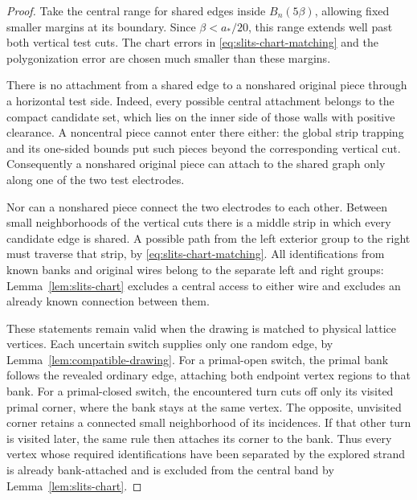 \begin{proof}
Take the central range for shared edges inside $B_n(5\beta)$,
allowing fixed smaller margins at its boundary.  Since
$\beta<a_*/20$, this range extends well past both vertical test
cuts.  The chart errors in
\eqref{eq:slits-chart-matching} and the polygonization error are
chosen much smaller than these margins.

There is no attachment from a shared edge to a nonshared original
piece through a horizontal test side.  Indeed, every possible
central attachment belongs to the compact candidate set, which
lies on the inner side of those walls with positive clearance.
A noncentral piece cannot enter there either: the global strip
trapping and its one-sided bounds put such pieces beyond the
corresponding vertical cut.  Consequently a nonshared original
piece can attach to the shared graph only along one of the two
test electrodes.

Nor can a nonshared piece connect the two electrodes to each other.
Between small neighborhoods of the vertical cuts there is a middle
strip in which every candidate edge is shared.  A possible path
from the left exterior group to the right must traverse that strip,
by \eqref{eq:slits-chart-matching}.  All identifications from known
banks and original wires belong to the separate left and right
groups: Lemma~\ref{lem:slits-chart} excludes a central access to
either wire and excludes an already known connection between them.

These statements remain valid when the drawing is matched to
physical lattice vertices.  Each uncertain switch supplies only
one random edge, by Lemma~\ref{lem:compatible-drawing}.  For a
primal-open switch, the primal bank follows the revealed ordinary
edge, attaching both endpoint vertex regions to that bank.  For a
primal-closed switch, the encountered turn cuts off only its visited
primal corner, where the bank stays at the same vertex.  The opposite,
unvisited corner retains a connected small neighborhood of its
incidences.  If that other turn is visited later, the same rule then
attaches its corner to the bank.  Thus every vertex whose required
identifications have been separated by the explored strand is
already bank-attached and is excluded from the central band by
Lemma~\ref{lem:slits-chart}.


\end{proof}
